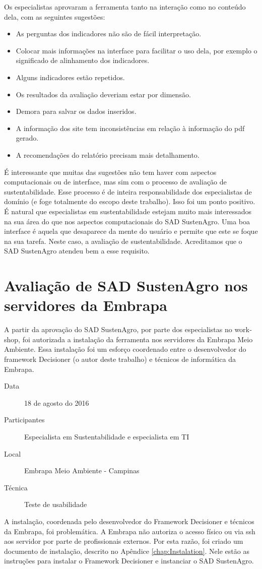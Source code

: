Os especialistas aprovaram a ferramenta tanto na interação como no
conteúdo dela, com as seguintes sugestões:
\begin{itemize}
\item As perguntas dos indicadores não são de fácil interpretação.
\item Colocar mais informações na interface para facilitar o uso dela, por
exemplo o significado de alinhamento dos indicadores.
\item Alguns indicadores estão repetidos.
\item Os resultados da avaliação deveriam estar por dimensão.
\item Demora para salvar os dados inseridos.
\item A informação dos site tem inconsistências em relação à informação
do pdf gerado.
\item A recomendações do relatório precisam mais detalhamento.
\end{itemize}
É interessante que muitas das sugestões não tem haver com aspectos
computacionais ou de interface, mas sim com o processo de avaliação
de sustentabilidade. Esse processo é de inteira responsabilidade dos
especialistas de domínio (e foge totalmente do escopo deste trabalho).
Isso foi um ponto positivo. É natural que especialistas em sustentabilidade
estejam muito mais interessados na sua área do que nos aspectos computacionais
do SAD SustenAgro. Uma boa interface é aquela que desaparece da mente
do usuário e permite que este se foque na sua tarefa. Neste caso,
a avaliação de sustentabilidade. Acreditamos que o SAD SustenAgro
atendeu bem a esse requisito.

\section{Avaliação de SAD SustenAgro nos servidores da Embrapa}

A partir da aprovação do SAD SustenAgro, por parte dos especialistas
no \foreignlanguage{english}{workshop}, foi autorizada a instalação
da ferramenta nos servidores da Embrapa Meio Ambiente. Essa instalação
foi um esforço coordenado entre o desenvolvedor do framework Decisioner
(o autor deste trabalho) e técnicos de informática da Embrapa.
\begin{description}
\item [{Data}] 18 de agosto do 2016
\item [{Participantes}] Especialista em Sustentabilidade e especialista
em TI
\item [{Local}] Embrapa Meio Ambiente - Campinas
\item [{Técnica}] Teste de usabilidade
\end{description}
A instalação, coordenada pelo desenvolvedor do Framework Decisioner
e técnicos da Embrapa, foi problemática. A Embrapa não autoriza o
acesso físico ou via ssh aos servidor por parte de profissionais externos.
Por esta razão, foi criado um documento de instalação, descrito no
Apêndice \ref{chap:Instalation}. Nele estão as instruções para instalar
o Framework Decisioner e instanciar o SAD SustenAgro.


